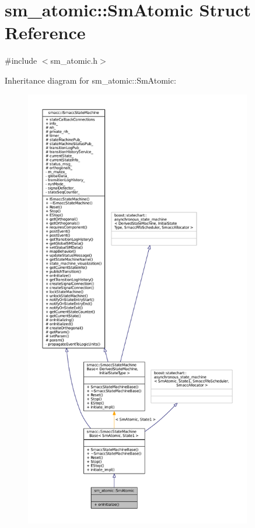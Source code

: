 \hypertarget{structsm__atomic_1_1SmAtomic}{}\section{sm\+\_\+atomic\+:\+:Sm\+Atomic Struct Reference}
\label{structsm__atomic_1_1SmAtomic}


{\ttfamily \#include $<$sm\+\_\+atomic.\+h$>$}



Inheritance diagram for sm\+\_\+atomic\+:\+:Sm\+Atomic\+:
\nopagebreak
\begin{figure}[H]
\begin{center}
\leavevmode
\includegraphics[height=550pt]{structsm__atomic_1_1SmAtomic__inherit__graph}
\end{center}
\end{figure}


